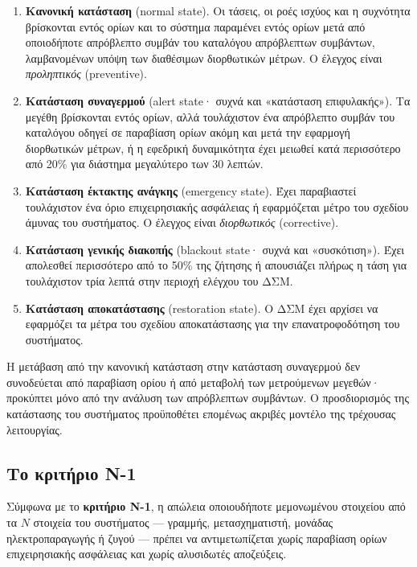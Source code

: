 \begin{enumerate}
\item \textbf{Κανονική κατάσταση} (normal state). Οι τάσεις, οι ροές ισχύος και η συχνότητα
      βρίσκονται εντός ορίων και το σύστημα παραμένει εντός ορίων μετά από οποιοδήποτε
      απρόβλεπτο συμβάν του καταλόγου απρόβλεπτων συμβάντων, λαμβανομένων υπόψη των
      διαθέσιμων διορθωτικών μέτρων. Ο έλεγχος είναι \emph{προληπτικός} (preventive).
\item \textbf{Κατάσταση συναγερμού} (alert state· συχνά και «κατάσταση επιφυλακής»). Τα
      μεγέθη βρίσκονται εντός ορίων, αλλά τουλάχιστον ένα απρόβλεπτο συμβάν του καταλόγου
      οδηγεί σε παραβίαση ορίων ακόμη και μετά την εφαρμογή διορθωτικών μέτρων, ή η
      εφεδρική δυναμικότητα έχει μειωθεί κατά περισσότερο από 20\% για διάστημα
      μεγαλύτερο των 30 λεπτών.
\item \textbf{Κατάσταση έκτακτης ανάγκης} (emergency state). Έχει παραβιαστεί τουλάχιστον
      ένα όριο επιχειρησιακής ασφάλειας ή εφαρμόζεται μέτρο του σχεδίου άμυνας του
      συστήματος. Ο έλεγχος είναι \emph{διορθωτικός} (corrective).
\item \textbf{Κατάσταση γενικής διακοπής} (blackout state· συχνά και «συσκότιση»). Έχει
      απολεσθεί περισσότερο από το 50\% της ζήτησης ή απουσιάζει πλήρως η τάση για
      τουλάχιστον τρία λεπτά στην περιοχή ελέγχου του ΔΣΜ.
\item \textbf{Κατάσταση αποκατάστασης} (restoration state). Ο ΔΣΜ έχει αρχίσει να
      εφαρμόζει τα μέτρα του σχεδίου αποκατάστασης για την επανατροφοδότηση του
      συστήματος.
\end{enumerate}

Η μετάβαση από την κανονική κατάσταση στην κατάσταση συναγερμού δεν συνοδεύεται από
παραβίαση ορίου ή από μεταβολή των μετρούμενων μεγεθών· προκύπτει μόνο από την ανάλυση
των απρόβλεπτων συμβάντων. Ο προσδιορισμός της κατάστασης του συστήματος προϋποθέτει
επομένως ακριβές μοντέλο της τρέχουσας λειτουργίας.

\subsection{Το κριτήριο N-1}

Σύμφωνα με το \textbf{κριτήριο N-1}, η απώλεια οποιουδήποτε μεμονωμένου στοιχείου από τα $N$
στοιχεία του συστήματος — γραμμής, μετασχηματιστή, μονάδας ηλεκτροπαραγωγής ή ζυγού —
πρέπει να αντιμετωπίζεται χωρίς παραβίαση ορίων επιχειρησιακής ασφάλειας και χωρίς
αλυσιδωτές αποζεύξεις.

